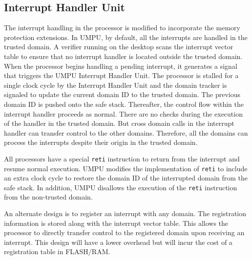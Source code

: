 \subsection{Interrupt Handler Unit}
\label{sec:umpuintr}
%
The interrupt handling in the processor is modified to incorporate the
memory protection extensions.
%
In UMPU, by default, all the interrupts are handled in the trusted domain.
%
A verifier running on the desktop scans the interrupt vector table to
ensure that no interrupt handler is located outside the trusted
domain.
%
When the processor begins handling a pending interrupt, it generates a
signal that triggers the UMPU Interrupt Handler Unit.
%
The processor is stalled for a single clock cycle by the Interrupt
Handler Unit and the domain tracker is signaled to update the current
domain ID to the trusted domain.
%
The previous domain ID is pushed onto the safe stack.
%
Thereafter, the control flow within the interrupt handler proceeds as
normal.
%
There are no checks during the execution of the handler in the trusted
domain.
%
But cross domain calls in the interrupt handler can transfer control
to the other domains.
%
Therefore, all the domains can process the interrupts despite their
origin in the trusted domain.
%

All processors have a special \texttt{reti} instruction to return from
the interrupt and resume normal execution.
%
UMPU modifies the implementation of \texttt{reti} to include an extra
clock cycle to restore the domain ID of the interrupted domain from
the safe stack.
%
In addition, UMPU disallows the execution of the \texttt{reti} instruction from the non-trusted domain.

An alternate design is to register an interrupt with any
domain.
%
The registration information is stored along with the interrupt
vector table.
%
This allows the processor to directly transfer control to the registered domain
upon receiving an interrupt.
%
This design will have a lower overhead but will incur the cost of a
registration table in FLASH/RAM.
